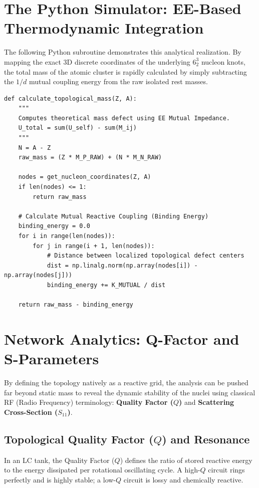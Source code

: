 \section{The Python Simulator: EE-Based Thermodynamic Integration}
The following Python subroutine demonstrates this analytical realization. By mapping the exact 3D discrete coordinates of the underlying $6^3_2$ nucleon knots, the total mass of the atomic cluster is rapidly calculated by simply subtracting the $1/d$ mutual coupling energy from the raw isolated rest masses.

\begin{verbatim}
def calculate_topological_mass(Z, A):
    """
    Computes theoretical mass defect using EE Mutual Impedance.
    U_total = sum(U_self) - sum(M_ij)
    """
    N = A - Z
    raw_mass = (Z * M_P_RAW) + (N * M_N_RAW)
    
    nodes = get_nucleon_coordinates(Z, A)
    if len(nodes) <= 1:
        return raw_mass
        
    # Calculate Mutual Reactive Coupling (Binding Energy)
    binding_energy = 0.0
    for i in range(len(nodes)):
        for j in range(i + 1, len(nodes)):
            # Distance between localized topological defect centers
            dist = np.linalg.norm(np.array(nodes[i]) - np.array(nodes[j]))
            binding_energy += K_MUTUAL / dist
            
    return raw_mass - binding_energy
\end{verbatim}

\section{Network Analytics: Q-Factor and S-Parameters}
By defining the topology natively as a reactive grid, the analysis can be pushed far beyond static mass to reveal the dynamic stability of the nuclei using classical RF (Radio Frequency) terminology: \textbf{Quality Factor ($Q$)} and \textbf{Scattering Cross-Section ($S_{11}$)}.

\subsection{Topological Quality Factor ($Q$) and Resonance}
In an LC tank, the Quality Factor ($Q$) defines the ratio of stored reactive energy to the energy dissipated per rotational oscillating cycle. A high-$Q$ circuit rings perfectly and is highly stable; a low-$Q$ circuit is lossy and chemically reactive. 

